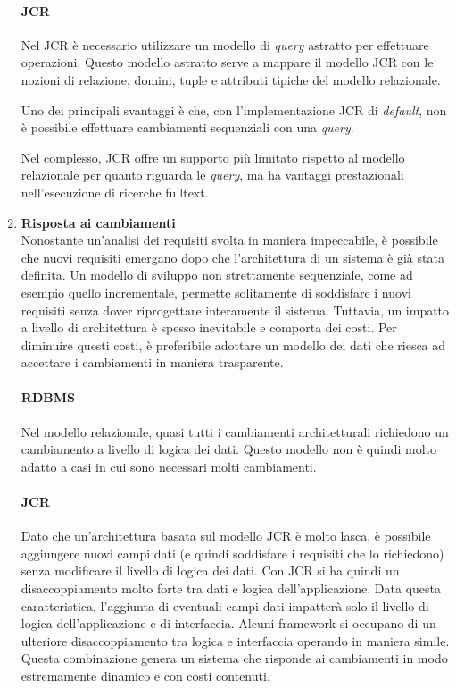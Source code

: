 \begin{enumerate}
					
					\paragraph{JCR} 
						Nel JCR è necessario utilizzare un modello di \textit{query} astratto per effettuare operazioni. Questo modello astratto serve a mappare il modello JCR con le nozioni di relazione, domini, tuple e attributi tipiche del modello relazionale.
						
						
						Uno dei principali svantaggi è che, con l'implementazione JCR di \textit{default}, non è possibile effettuare cambiamenti sequenziali con una \textit{query}.
					
					
						Nel complesso, JCR offre un supporto più limitato rispetto al modello relazionale per quanto riguarda le \textit{query}, ma ha vantaggi prestazionali nell'esecuzione di ricerche \gls{fulltext}.
					
				\item \textbf{Risposta ai cambiamenti} \\
					Nonostante un'analisi dei requisiti svolta in maniera impeccabile, è possibile che nuovi requisiti emergano dopo che l'architettura di un sistema è già stata definita. Un modello di sviluppo non strettamente sequenziale, come ad esempio quello incrementale, permette solitamente di soddisfare i nuovi requisiti senza dover riprogettare interamente il sistema. Tuttavia, un impatto a livello di architettura è spesso inevitabile e comporta dei costi. Per diminuire questi costi, è preferibile adottare un modello dei dati che riesca ad accettare i cambiamenti in maniera trasparente.
					
					\paragraph{RDBMS} 
						Nel modello relazionale, quasi tutti i cambiamenti architetturali richiedono un cambiamento a livello di logica dei dati. Questo modello non è quindi molto adatto a casi in cui sono necessari molti cambiamenti.
					
					
					\paragraph{JCR} 
						Dato che un'architettura basata sul modello JCR è molto lasca, è possibile aggiungere nuovi campi dati (e quindi soddisfare i requisiti che lo richiedono) senza modificare il livello di logica dei dati. Con JCR si ha quindi un disaccoppiamento molto forte tra dati e logica dell'applicazione. 
						Data questa caratteristica, l'aggiunta di eventuali campi dati impatterà solo il livello di logica dell'applicazione e di interfaccia. Alcuni \gls{framework} si occupano di un ulteriore disaccoppiamento tra logica e interfaccia operando in maniera simile. Questa combinazione genera un sistema che risponde ai cambiamenti in modo estremamente dinamico e con costi contenuti.
		\end{enumerate}
				

